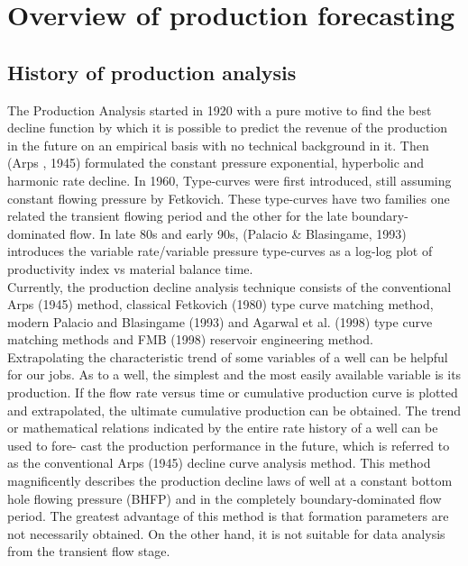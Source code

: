\documentclass[12pt,a4paper]{report}
\begin{document}

\chapter{Overview of production forecasting}
\section{History of production analysis\cite{Hedong}}
The Production Analysis started in 1920 with a pure motive to find the best decline function by which it is possible to predict the revenue of the production in the future on an empirical basis with no technical background in it. Then (Arps , 1945) formulated the constant pressure exponential, hyperbolic and harmonic rate decline. In 1960, Type-curves were first introduced, still assuming constant flowing pressure by Fetkovich. These type-curves have two families one related the transient flowing period and the other for the late boundary- dominated flow. In late 80s and early 90s, (Palacio \& Blasingame, 1993) introduces the variable rate/variable pressure type-curves as a log-log plot of productivity index vs material balance time.\\
Currently, the production decline analysis technique consists of the conventional Arps (1945) method, classical Fetkovich (1980) type curve matching method, modern Palacio and Blasingame (1993) and Agarwal et al. (1998) type curve matching methods and FMB (1998) reservoir engineering method.\\
Extrapolating the characteristic trend of some variables of a well can be helpful for our jobs. As to a well, the simplest and the most easily available variable is its production. If the flow rate versus time or cumulative production curve is plotted and extrapolated, the ultimate cumulative production can be obtained. The trend or mathematical relations indicated by the entire rate history of a well can be used to fore- cast the production performance in the future, which is referred to as the conventional Arps (1945) decline curve analysis method. This method magnificently describes the production decline laws of well at a constant bottom hole flowing pressure (BHFP) and in the completely boundary-dominated flow period. The greatest advantage of this method is that formation parameters are not necessarily obtained. On the other hand, it is not suitable for data analysis from the transient flow stage.\\
\end{document}
